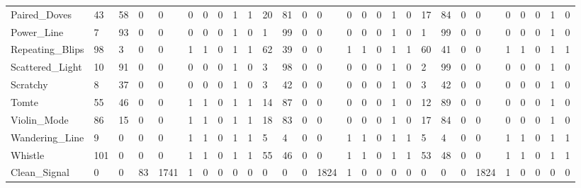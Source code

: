\begin{tabular}{lllllrrlrrllllrrlllllllrrlll}
Paired\_Doves & 43 & 58 & 0 & 0 & 0 & 0 & 0 & 1 & 1 & 20 & 81 & 0 & 0 & 0 & 0 & 0 & 1 & 0 & 17 & 84 & 0 & 0 & 0 & 0 & 0 & 1 & 0 \\
Power\_Line & 7 & 93 & 0 & 0 & 0 & 0 & 0 & 1 & 0 & 1 & 99 & 0 & 0 & 0 & 0 & 0 & 1 & 0 & 1 & 99 & 0 & 0 & 0 & 0 & 0 & 1 & 0 \\
Repeating\_Blips & 98 & 3 & 0 & 0 & 1 & 1 & 0 & 1 & 1 & 62 & 39 & 0 & 0 & 1 & 1 & 0 & 1 & 1 & 60 & 41 & 0 & 0 & 1 & 1 & 0 & 1 & 1 \\
Scattered\_Light & 10 & 91 & 0 & 0 & 0 & 0 & 0 & 1 & 0 & 3 & 98 & 0 & 0 & 0 & 0 & 0 & 1 & 0 & 2 & 99 & 0 & 0 & 0 & 0 & 0 & 1 & 0 \\
Scratchy & 8 & 37 & 0 & 0 & 0 & 0 & 0 & 1 & 0 & 3 & 42 & 0 & 0 & 0 & 0 & 0 & 1 & 0 & 3 & 42 & 0 & 0 & 0 & 0 & 0 & 1 & 0 \\
Tomte & 55 & 46 & 0 & 0 & 1 & 1 & 0 & 1 & 1 & 14 & 87 & 0 & 0 & 0 & 0 & 0 & 1 & 0 & 12 & 89 & 0 & 0 & 0 & 0 & 0 & 1 & 0 \\
Violin\_Mode & 86 & 15 & 0 & 0 & 1 & 1 & 0 & 1 & 1 & 18 & 83 & 0 & 0 & 0 & 0 & 0 & 1 & 0 & 17 & 84 & 0 & 0 & 0 & 0 & 0 & 1 & 0 \\
Wandering\_Line & 9 & 0 & 0 & 0 & 1 & 1 & 0 & 1 & 1 & 5 & 4 & 0 & 0 & 1 & 1 & 0 & 1 & 1 & 5 & 4 & 0 & 0 & 1 & 1 & 0 & 1 & 1 \\
Whistle & 101 & 0 & 0 & 0 & 1 & 1 & 0 & 1 & 1 & 55 & 46 & 0 & 0 & 1 & 1 & 0 & 1 & 1 & 53 & 48 & 0 & 0 & 1 & 1 & 0 & 1 & 1 \\
Clean\_Signal & 0 & 0 & 83 & 1741 & 1 & 0 & 0 & 0 & 0 & 0 & 0 & 0 & 1824 & 1 & 0 & 0 & 0 & 0 & 0 & 0 & 0 & 1824 & 1 & 0 & 0 & 0 & 0 \\
\bottomrule
\end{tabular}

